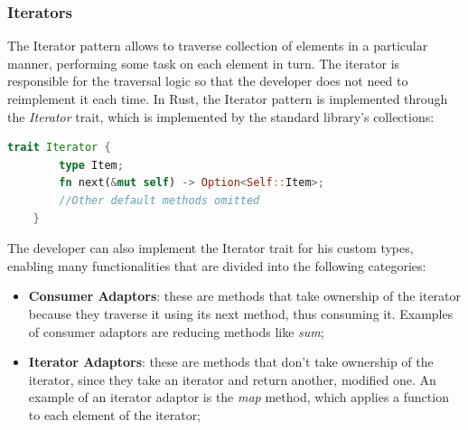 

\subsubsection{Iterators}
The Iterator pattern allows to traverse collection of elements in a particular manner, performing some task on each element in turn. The iterator is responsible for the traversal logic
so that the developer does not need to reimplement it each time. In Rust, the Iterator pattern is implemented through the \textit{Iterator} trait, which is implemented by the standard library's collections:

\begin{lstlisting}[language=Rust]
    trait Iterator {
        type Item;
        fn next(&mut self) -> Option<Self::Item>;
        //Other default methods omitted
    }
\end{lstlisting}

The developer can also implement the Iterator trait for his custom types, enabling many functionalities that are divided into the following categories:

\begin{itemize}
    \item \textbf{Consumer Adaptors}: these are methods that take ownership of the iterator because they traverse it using its next method, thus consuming it. Examples of consumer adaptors are reducing methods like \textit{sum};
    \item \textbf{Iterator Adaptors}: these are methods that don't take ownership of the iterator, since they take an iterator and return another, modified one. An example of an iterator adaptor is the \textit{map} method, which applies a function to each element of the iterator;
\end{itemize}

